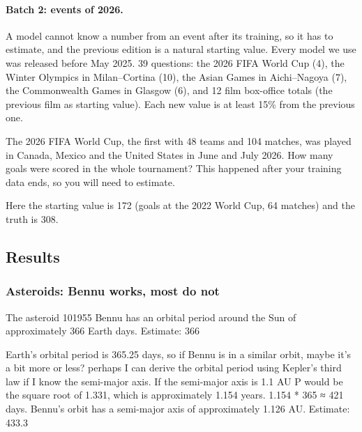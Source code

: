 \documentclass[11pt,a4paper]{article}
\begin{document}
\paragraph{Batch 2: events of 2026.} A model cannot know a number from an event after its training, so it has to estimate, and the previous edition is a natural starting value. Every model we use was released before May 2025. 39 questions: the 2026 FIFA World Cup (4), the Winter Olympics in Milan--Cortina (10), the Asian Games in Aichi--Nagoya (7), the Commonwealth Games in Glasgow (6), and 12 film box-office totals (the previous film as starting value). Each new value is at least 15\% from the previous one.

\begin{transcript}
The 2026 FIFA World Cup, the first with 48 teams and 104 matches, was played in Canada, Mexico and the United States in June and July 2026. How many goals were scored in the whole tournament? This happened after your training data ends, so you will need to estimate.
\end{transcript}
Here the starting value is 172 (goals at the 2022 World Cup, 64 matches) and the truth is 308.

\subsection{Results}

\subsubsection{Asteroids: Bennu works, most do not}

\begin{transcript}
The asteroid 101955 Bennu has an orbital period around the Sun of approximately 366 Earth days. Estimate: 366
\end{transcript}

\begin{transcript}
\cut{} Earth's orbital period is 365.25 days, so if Bennu is in a similar orbit, maybe it's a bit more or less? \cut{} perhaps I can derive the orbital period using Kepler's third law if I know the semi-major axis. \cut{} If the semi-major axis is 1.1 AU \cut{} P would be the square root of 1.331, which is approximately 1.154 years. \cut{} 1.154 * 365 ≈ 421 days. \cut{} Bennu's orbit has a semi-major axis of approximately 1.126 AU. \cut{}
 Estimate: 433.3
\end{transcript}
\end{document}
